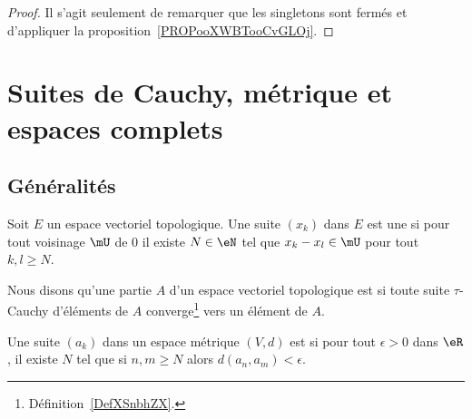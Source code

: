 \begin{proof}
	Il s'agit seulement de remarquer que les singletons sont fermés et d'appliquer la proposition~\ref{PROPooXWBTooCvGLOj}.
\end{proof}

\section{Suites de Cauchy, métrique et espaces complets}

\subsection{Généralités}

\begin{definition}   \label{DefZSnlbPc}
	Soit \( E\) un espace vectoriel topologique. Une suite \( (x_k)\) dans \( E\) est une  si pour tout voisinage \( \mU\) de \( 0\) il existe \( N\in \eN\) tel que \( x_k-x_l\in\mU\) pour tout \( k,l\geq N\).
\end{definition}

\begin{definition}      \label{DEFooVQDBooNxprFU}
	Nous disons qu'une partie \( A\) d'un espace vectoriel topologique est  si toute suite \(  \tau\)-Cauchy d'éléments de \( A\) converge\footnote{Définition~\ref{DefXSnbhZX}.} vers un élément de \( A\).
\end{definition}

\begin{definition}      \label{DEFooXOYSooSPTRTn}
	Une suite \( (a_k)\) dans un espace métrique \( (V,d)\) est  si pour tout \( \epsilon> 0\) dans \( \eR\), il existe \( N\) tel que si \( n,m\geq N\) alors \( d(a_n,a_m)<\epsilon\).
\end{definition}


